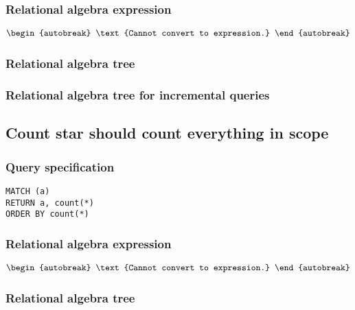 \subsubsection*{Relational algebra expression}

\begin{align*}
\begin{autobreak}
\text{Cannot convert to expression.}
\end{autobreak}
\end{align*}

\subsubsection*{Relational algebra tree}


\subsubsection*{Relational algebra tree for incremental queries}


\subsection{Count star should count everything in scope}

\subsubsection*{Query specification}

\begin{lstlisting}
MATCH (a)
RETURN a, count(*)
ORDER BY count(*)
\end{lstlisting}

\subsubsection*{Relational algebra expression}

\begin{align*}
\begin{autobreak}
\text{Cannot convert to expression.}
\end{autobreak}
\end{align*}

\subsubsection*{Relational algebra tree}


